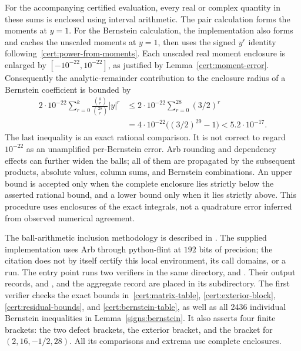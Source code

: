 For the accompanying certified evaluation, every real or complex quantity
in these sums is enclosed using interval arithmetic.  The pair calculation
forms the moments at $y=1$.  For the Bernstein calculation, the
implementation also forms and caches the unscaled moments at $y=1$, then
uses the signed $y^r$ identity following~\eqref{cert:power-from-moments}.
Each unscaled real moment enclosure is enlarged by
$[-10^{-22},10^{-22}]$, as justified by Lemma~\ref{cert:moment-error}.
Consequently the analytic-remainder contribution to the enclosure radius
of a Bernstein coefficient is bounded by
\[
\begin{aligned}
 2\cdot10^{-22}\sum_{r=0}^k
   \frac{\binom{k}{r}}{\binom{28}{r}}|y|^r
 &\le2\cdot10^{-22}\sum_{r=0}^{28}(3/2)^r\\
 &=4\cdot10^{-22}\bigl((3/2)^{29}-1\bigr)<5.2\cdot10^{-17}.
\end{aligned}
\]
The last inequality is an exact rational comparison.  It is not correct
to regard $10^{-22}$ as an unamplified per-Bernstein error.
Arb rounding and dependency effects can further widen the balls; all of
them are propagated by the subsequent products, absolute values, column
sums, and Bernstein combinations.  An upper bound is accepted only when
the complete enclosure lies strictly below the asserted rational bound,
and a lower bound only when it lies strictly above.  This procedure uses
enclosures of the exact integrals, not a quadrature error inferred from
observed numerical agreement.

The ball-arithmetic inclusion methodology is described in
\cite{Johansson2017}.  The supplied implementation uses Arb through
python-flint at $192$ bits of precision; the citation does not by itself
certify this local environment, its call domains, or a run.
The entry point  runs two verifiers in
the same directory,  and
.  Their output records,  and
, and the aggregate record  are
placed in its  subdirectory.
The first verifier checks the exact bounds in~\eqref{cert:matrix-table},
\eqref{cert:exterior-block}, \eqref{cert:residual-bounds}, and
\eqref{cert:bernstein-table}, as well as all 2436 individual Bernstein
inequalities in Lemma~\ref{signs:bernstein}.  It also asserts
four finite brackets: the two defect brackets, the exterior bracket, and
the bracket for $(2,16,-1/2,28)$.  All its comparisons and extrema use
complete enclosures.

